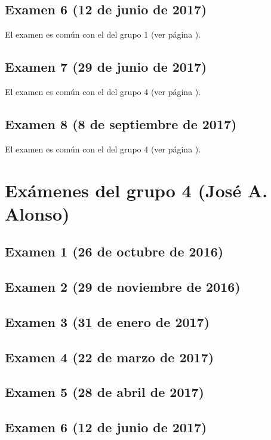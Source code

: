 \documentclass[a4paper,12pt,twoside]{book}
\begin{document}
\subsection{Examen 6 (12 de junio de 2017)} 
El examen es común con el del grupo 1 (ver página \pageref{examen_16_17_1_6}).
\subsection{Examen 7 (29 de junio de 2017)}
El examen es común con el del grupo 4 (ver página \pageref{examen_16_17_4_7}).
\subsection{Examen 8 (8 de septiembre de 2017)}
El examen es común con el del grupo 4 (ver página \pageref{examen_16_16_4_8}).

\section{Exámenes del grupo 4 (José A. Alonso)}
\subsection{Examen 1 (26 de octubre de 2016)}
\subsection{Examen 2 (29 de noviembre de 2016)}
\subsection{Examen 3 (31 de enero de 2017)}
 \label{examen_16_17_4_3}
\subsection{Examen 4 (22 de marzo de 2017)}
\subsection{Examen 5 (28 de abril de 2017)}
\subsection{Examen 6 (12 de junio de 2017)}
 \label{examen_16_17_4_6}
\end{document}
